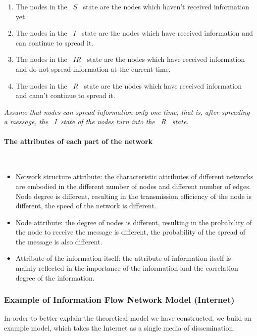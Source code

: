 \documentclass[a4paper,11pt]{article}
\begin{document}
\begin{enumerate}%
\renewcommand{\labelenumi}{(\theenumi)}
    \item The nodes in the ~$S$~ state are the nodes which haven't received information yet.
    
    \item The nodes in the ~$I$~ state are the nodes which have received information and can continue to spread it.
    \item The nodes in the ~$IR$~ state are the nodes which have received information and do not spread information at the current time.
    \item The nodes in the ~$R$~ state are the nodes which have received information and cann't continue to spread it.
\end{enumerate}
\emph{Assume that nodes can spread information only one time, that is, after spreading a message, the ~$I$~state of the nodes turn into the ~$R$~ state.
}


\paragraph{The attributes of each part of the network}
\textrm{\\}

\begin{itemize}
\item Network structure attribute: the characteristic attributes of different networks are embodied in the different number of nodes and different number of edges. Node degree is different, resulting in the transmission efficiency of the node is different, the speed of the network is different.
\item Node attribute: the degree of nodes is different, resulting in the probability of the node to receive the message is different, the probability of the spread of the message is also different.
\item Attribute of the information itself: the attribute of information itself is mainly reflected in the importance of the information and the correlation degree of the information.
\end{itemize}

\subsubsection{Example of Information Flow Network Model (Internet)}
\par In order to better explain the theoretical model we have constructed, we build an example model, which takes the Internet as a single media of dissemination.
\end{document}
